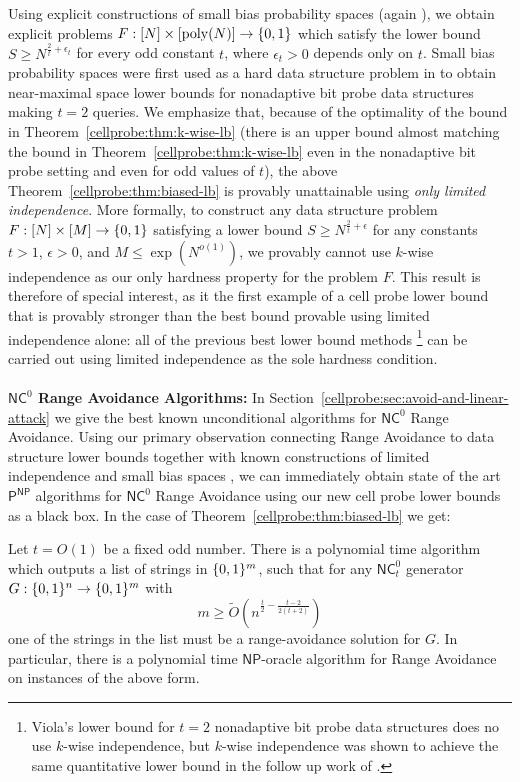 Using explicit constructions of small bias probability spaces (again \cite{naornaor}), we obtain explicit problems $F: [N] \times [\mathrm{poly}(N)] \to \{0,1\}$ which satisfy the lower bound $S \geq N^{\frac{2}{t} + \epsilon_t}$ for every odd constant $t$, where $\epsilon_t>0$ depends only on $t$. Small bias probability spaces were first used as a hard data structure problem in \cite{viola-maximal} to obtain near-maximal space lower bounds for nonadaptive bit probe data structures making $t=2$ queries. 
We emphasize that, because of the optimality of the bound in Theorem~\ref{cellprobe:thm:k-wise-lb} (there is an upper bound almost matching the bound in Theorem~\ref{cellprobe:thm:k-wise-lb} even in the nonadaptive bit probe setting and even for odd values of $t$), the above Theorem~\ref{cellprobe:thm:biased-lb} is provably unattainable using \emph{only limited independence}. More formally, to construct any data structure problem $F: [N] \times [M] \to \{0,1\}$ satisfying a lower bound $S \geq N^{\frac{2}{t} + \epsilon}$ for any constants $t > 1$, $\epsilon>0$, and $M \leq \exp(N^{o(1)})$, we provably cannot use $k$-wise independence as our only hardness property for the problem $F$. This result is therefore of special interest, as it the first example of a cell probe lower bound that is provably stronger than the best bound provable using limited independence alone: all of the previous best lower bound methods \cite{Siegel89,panigrahy,kasper,viola-maximal,golovnev}\footnote{Viola's lower bound for $t=2$ nonadaptive bit probe data structures \cite{viola-maximal} does no use $k$-wise independence, but $k$-wise independence was shown to achieve the same quantitative lower bound in the follow up work of \cite{golovnev}.} can be carried out using limited independence as the sole hardness condition.
~\\~\\
{\bf \noindent $\mathsf{NC}^0$ Range Avoidance Algorithms:}
In Section~\ref{cellprobe:sec:avoid-and-linear-attack} we give the best known unconditional algorithms for $\mathsf{NC}^0$ Range Avoidance. Using our primary observation connecting Range Avoidance to data structure lower bounds together with known constructions of limited independence and small bias spaces \cite{naornaor}, we can immediately obtain state of the art $\mathsf{P^{NP}}$ algorithms for $\mathsf{NC}^0$ Range Avoidance using our new cell probe lower bounds as a black box. In the case of Theorem~\ref{cellprobe:thm:biased-lb} we get:

\begin{theorem}
\label{cellprobe:thm:pnp-avoid-odd}
Let $t = O(1)$ be a fixed odd number. There is a polynomial time algorithm which outputs a list of strings in $\{0,1\}^m$, such that for any $\mathsf{NC}^0_t$ generator $G: \{0,1\}^n \to \{0,1\}^m$ with
\[
m \geq  \tilde{O}( n^{\frac{t}{2} - \frac{t-2}{2(t+2)}})
\]
one of the strings in the list must be a range-avoidance solution for $G$. In particular, there is a polynomial time $\mathsf{NP}$-oracle algorithm for Range Avoidance on instances of the above form.
\end{theorem}

